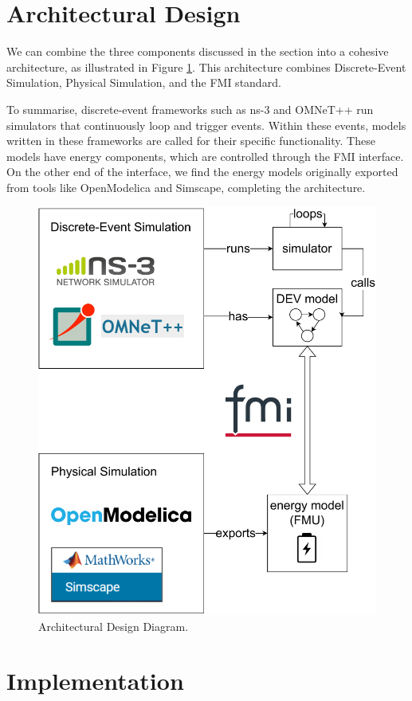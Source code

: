 \documentclass[conference]{IEEEtran}
\def\ns3{ns-3}
\begin{document}
\section{Architectural Design}

We can combine the three components discussed in the  section into a cohesive architecture, as illustrated in Figure \ref{architectural-design}. This architecture combines Discrete-Event Simulation, Physical Simulation, and the FMI standard.

To summarise, discrete-event frameworks such as \ns3 and OMNeT++ run simulators that continuously loop and trigger events. Within these events, models written in these frameworks are called for their specific functionality. These models have energy components, which are controlled through the FMI interface. On the other end of the interface, we find the energy models originally exported from tools like OpenModelica and Simscape, completing the architecture.

\begin{figure}[htbp]
  \centering
  \includegraphics[width=0.8\linewidth]{images/architectural-design.drawio.pdf}
  \caption{Architectural Design Diagram.}
  \label{architectural-design}
\end{figure}

\section{Implementation}
\end{document}
